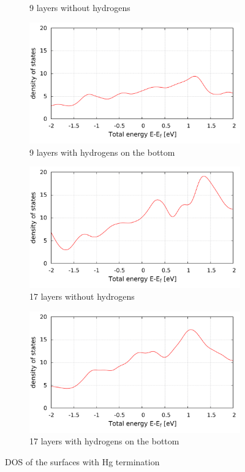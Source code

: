 \begin{figure}[tbp]
\begin{subfigure}[c]{.48\linewidth}
			\caption{9 layers without hydrogens}
		\end{subfigure}
		\hfill
		\begin{subfigure}[c]{.48\linewidth}
			\centering
			\includegraphics[width=\linewidth]{Hg_termination/DOS_9_layers_-2_2.pdf}
			\caption{9 layers with hydrogens on the bottom}
		\end{subfigure}
		\begin{subfigure}[c]{.48\linewidth}
			\centering 
			\includegraphics[width=\linewidth]{Hg_termination/no_H_DOS_17_layers_-2_2.pdf}
			\caption{17 layers without hydrogens} \label{}
		\end{subfigure}
		\hfill
		\begin{subfigure}[c]{.48\linewidth}
			\centering
			\includegraphics[width=\linewidth]{Hg_termination/DOS_17_layers_-2_2.pdf}
			\caption{17 layers with hydrogens on the bottom}
		\end{subfigure}
		\caption{DOS of the surfaces with Hg termination} 
		\label{dos_surface_odd_layers_Hg}
	\end{figure}
